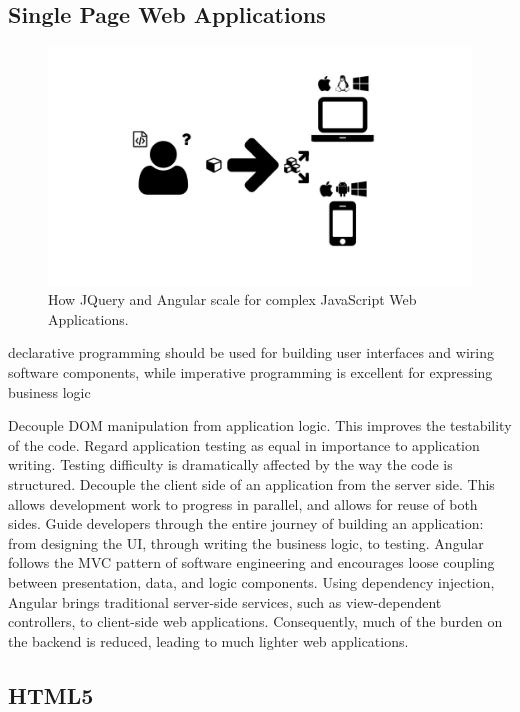 \subsection{Single Page Web Applications}

\begin{figure}
  \centering
  \includegraphics[width=\textwidth, page=3]{images/Figures.pdf}
  \caption{How JQuery and Angular scale for complex JavaScript Web Applications.}
  \label{Figure:jquery-vs-angular}
\end{figure}

declarative programming should be used for building user interfaces and wiring software components, while imperative programming is excellent for expressing business logic


Decouple DOM manipulation from application logic. This improves the testability of the code. Regard application testing as equal in importance to application writing. Testing difficulty is dramatically affected by the way the code is structured.
Decouple the client side of an application from the server side. This allows development work to progress in parallel, and allows for reuse of both sides.
Guide developers through the entire journey of building an application: from designing the UI, through writing the business logic, to testing.
Angular follows the MVC pattern of software engineering and encourages loose coupling between presentation, data, and logic components. Using dependency injection, Angular brings traditional server-side services, such as view-dependent controllers, to client-side web applications. Consequently, much of the burden on the backend is reduced, leading to much lighter web applications.

\subsection{HTML5}
\label{sec:html5}
